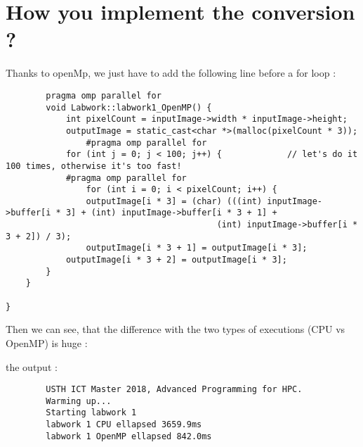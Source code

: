 \documentclass[paper=a4, fontsize=11pt]{scrartcl}
\begin{document}
\section{How you implement the conversion ?}
Thanks to openMp, we just have to add the following line before a for loop : 


	\begin{verbatim}
	    pragma omp parallel for
	    void Labwork::labwork1_OpenMP() {
            int pixelCount = inputImage->width * inputImage->height;
            outputImage = static_cast<char *>(malloc(pixelCount * 3));
                #pragma omp parallel for
            for (int j = 0; j < 100; j++) {             // let's do it 100 times, otherwise it's too fast!
	        #pragma omp parallel for
                for (int i = 0; i < pixelCount; i++) {
                outputImage[i * 3] = (char) (((int) inputImage->buffer[i * 3] + (int) inputImage->buffer[i * 3 + 1] +
                                          (int) inputImage->buffer[i * 3 + 2]) / 3);
                outputImage[i * 3 + 1] = outputImage[i * 3];
            outputImage[i * 3 + 2] = outputImage[i * 3];
        }
    }

}
	\end{verbatim}\newline

    
Then we can see, that the difference with the two types of executions (CPU vs OpenMP) is huge : \newline
    
    the output : \newline
    \begin{verbatim}
        USTH ICT Master 2018, Advanced Programming for HPC.
        Warming up...
        Starting labwork 1
        labwork 1 CPU ellapsed 3659.9ms
        labwork 1 OpenMP ellapsed 842.0ms
    \end{verbatim}

\end{document}
